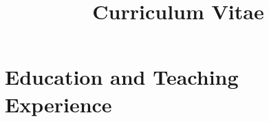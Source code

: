 \documentclass[10pt,letterpaper,sans]{moderncv}        %
\title{Curriculum Vitae}                               %
\begin{document}
\makecvtitle

\vspace{-0.5in} 

%

\section{Education and Teaching Experience} 
\end{document}

